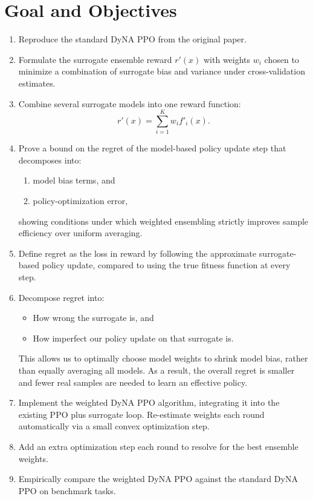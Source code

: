 \documentclass[conference]{IEEEtran}
\begin{document}
\section{Goal and Objectives}
\begin{enumerate}
    \item Reproduce the standard DyNA PPO from the original paper.
    
    \item Formulate the surrogate ensemble reward $r'(x)$ with weights $w_i$ chosen to minimize a combination of surrogate bias and variance under cross-validation estimates. 
    
    \item Combine several surrogate models into one reward function:
    \[
        r'(x) = \sum_{i=1}^K w_i f'_i(x).
    \]
    
    \item Prove a bound on the regret of the model-based policy update step that decomposes into:
    \begin{enumerate}
        \item model bias terms, and 
        \item policy-optimization error,
    \end{enumerate}
    showing conditions under which weighted ensembling strictly improves sample efficiency over uniform averaging.
    
    \item Define regret as the loss in reward by following the approximate surrogate-based policy update, compared to using the true fitness function at every step. 
    
    \item Decompose regret into:
    \begin{itemize}
        \item How wrong the surrogate is, and 
        \item How imperfect our policy update on that surrogate is.
    \end{itemize}
    
    This allows us to optimally choose model weights to shrink model bias, rather than equally averaging all models. As a result, the overall regret is smaller and fewer real samples are needed to learn an effective policy.
    
    \item Implement the weighted DyNA PPO algorithm, integrating it into the existing PPO plus surrogate loop. Re-estimate weights each round automatically via a small convex optimization step.
    
    \item Add an extra optimization step each round to resolve for the best ensemble weights.
    
    \item Empirically compare the weighted DyNA PPO against the standard DyNA PPO on benchmark tasks.
\end{enumerate}
\end{document}
